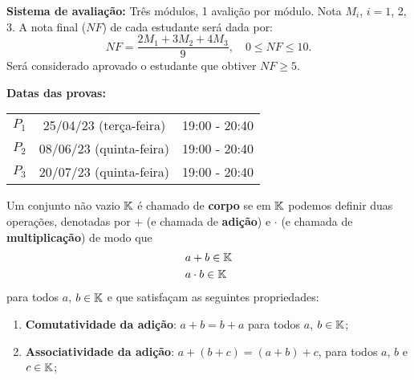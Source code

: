 \documentclass{beamer}
\begin{document}
    \begin{frame}
        {\bf{Sistema de avaliação:}} Três módulos, 1 avalição por módulo.
            Nota $M_i$, $i=1$, 2, 3. A nota final ($NF$) de cada estudante ser\'a dada por:
        \[
            NF = \dfrac{2M_1 + 3M_2 + 4M_3}{9}, \quad 0 \le NF \le 10.
        \]
        Ser\'a considerado aprovado o estudante que obtiver $NF \ge 5$.
    \end{frame}

    \begin{frame}
        {\bf Datas das provas:}
        \begin{center}
            \begin{tabular}{c|c|c}
                \hline\hline
                \hspace{0.5cm}{\bf Prova}\hspace{0.5cm} & \hspace{1cm}{\bf Data}\hspace{1cm} & \hspace{1cm}{\bf Hor\'{a}rio}\hspace{1cm} \\
                \hline\hline
                $P_1$ & 25/04/23 (terça-feira) & 19:00 - 20:40 \\
                \hline
                $P_2$ & 08/06/23 (quinta-feira) & 19:00 - 20:40 \\
                \hline
                $P_3$ & 20/07/23 (quinta-feira) & 19:00 - 20:40 \\
                \hline\hline
            \end{tabular}
        \end{center}
    \end{frame}

    \begin{frame}
        \begin{definicao}\label{corpo}
	Um conjunto n\~ao vazio $\mathbb{K}$ \'e chamado de \textbf{corpo} se em $\mathbb{K}$ podemos definir duas opera\c{c}\~oes, denotadas por $+$ (e chamada de \textbf{adi\c{c}\~ao}) e $\cdot$ (e chamada de \textbf{multiplica\c{c}\~ao}) de modo que
	\begin{align*}
            a &+ b \in \mathbb{K}\\
	    a &\cdot b \in \mathbb{K}
	\end{align*}
	para todos $a$, $b \in \mathbb{K}$ e que satisfa\c{c}am as seguintes propriedades:
	    \begin{enumerate}[label={\roman*})]
		\item \textbf{Comutatividade da adi\c{c}\~ao}: $a + b = b + a$ para todos $a$, $b \in \mathbb{K}$;
		\item \textbf{Associatividade da adi\c{c}\~ao}: $a + (b + c) = (a + b) + c$, para todos $a$, $b$ e $c \in \mathbb{K}$;
                \seti
            \end{enumerate}
        \end{definicao}
    \end{frame}
\end{document}
